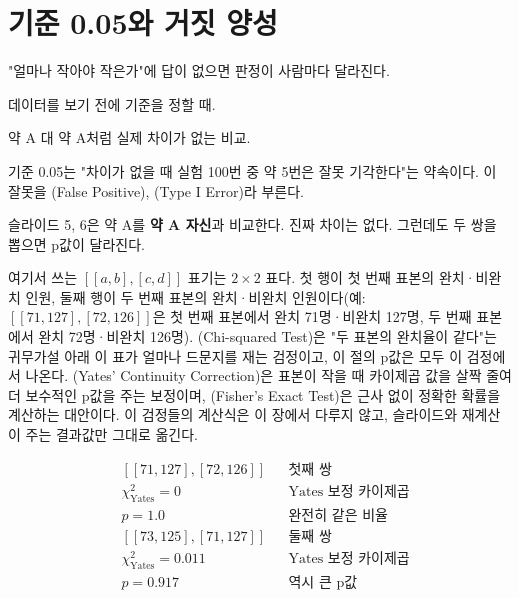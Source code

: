 \section{기준 0.05와 거짓 양성}
\label{sec:pv-threshold}

\begin{inbrief}
  \item[Why] "얼마나 작아야 작은가"에 답이 없으면 판정이 사람마다 달라진다.
  \item[When] 데이터를 보기 전에 기준을 정할 때.
  \item[Where] 약 A 대 약 A처럼 실제 차이가 없는 비교.
  \item[How] 기준 0.05는 "차이가 없을 때 실험 100번 중 약 5번은 잘못
             기각한다"는 약속이다. 이 잘못을 (False
             Positive), (Type I Error)라 부른다.
\end{inbrief}

슬라이드 5, 6은 약 A를 \textbf{약 A 자신}과 비교한다. 진짜 차이는 없다.
그런데도 두 쌍을 뽑으면 p값이 달라진다.

여기서 쓰는 $[[a,b],[c,d]]$ 표기는 $2\times2$ 표다. 첫 행이 첫 번째 표본의
완치·비완치 인원, 둘째 행이 두 번째 표본의 완치·비완치 인원이다(예:
$[[71,127],[72,126]]$은 첫 번째 표본에서 완치 71명·비완치 127명, 두 번째
표본에서 완치 72명·비완치 126명). (Chi-squared Test)은
"두 표본의 완치율이 같다"는 귀무가설 아래 이 표가 얼마나 드문지를 재는
검정이고, 이 절의 p값은 모두 이 검정에서 나온다. (Yates'
Continuity Correction)은 표본이 작을 때 카이제곱 값을 살짝 줄여 더 보수적인
p값을 주는 보정이며, (Fisher's Exact Test)은 근사 없이
정확한 확률을 계산하는 대안이다. 이 검정들의 계산식은 이 장에서 다루지
않고, 슬라이드와 재계산이 주는 결과값만 그대로 옮긴다.

\begin{align*}
  &[[71,127],[72,126]] && \text{첫째 쌍}\\
  &\chi^2_{\text{Yates}} = 0 && \text{Yates 보정 카이제곱}\\
  &p = 1.0 && \text{완전히 같은 비율}
\end{align*}
\begin{align*}
  &[[73,125],[71,127]] && \text{둘째 쌍}\\
  &\chi^2_{\text{Yates}} = 0.011 && \text{Yates 보정 카이제곱}\\
  &p = 0.917 && \text{역시 큰 p값}
\end{align*}

